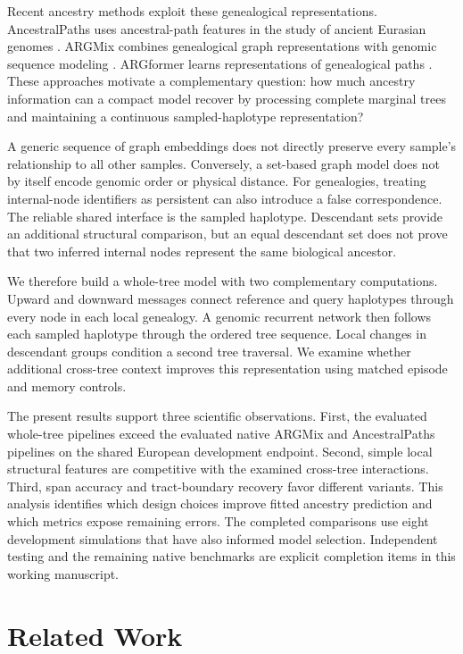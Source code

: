 \documentclass[letterpaper]{article}
\begin{document}
Recent ancestry methods exploit these genealogical representations. AncestralPaths uses ancestral-path features in the study of ancient Eurasian genomes \citep{eurasians2024}. ARGMix combines genealogical graph representations with genomic sequence modeling \citep{ancientancestry2026}. ARGformer learns representations of genealogical paths \citep{argformer2026}. These approaches motivate a complementary question: how much ancestry information can a compact model recover by processing complete marginal trees and maintaining a continuous sampled-haplotype representation?

A generic sequence of graph embeddings does not directly preserve every sample's relationship to all other samples. Conversely, a set-based graph model does not by itself encode genomic order or physical distance. For genealogies, treating internal-node identifiers as persistent can also introduce a false correspondence. The reliable shared interface is the sampled haplotype. Descendant sets provide an additional structural comparison, but an equal descendant set does not prove that two inferred internal nodes represent the same biological ancestor.

We therefore build a whole-tree model with two complementary computations. Upward and downward messages connect reference and query haplotypes through every node in each local genealogy. A genomic recurrent network then follows each sampled haplotype through the ordered tree sequence. Local changes in descendant groups condition a second tree traversal. We examine whether additional cross-tree context improves this representation using matched episode and memory controls.

The present results support three scientific observations. First, the evaluated whole-tree pipelines exceed the evaluated native ARGMix and AncestralPaths pipelines on the shared European development endpoint. Second, simple local structural features are competitive with the examined cross-tree interactions. Third, span accuracy and tract-boundary recovery favor different variants. This analysis identifies which design choices improve fitted ancestry prediction and which metrics expose remaining errors. The completed comparisons use eight development simulations that have also informed model selection. Independent testing and the remaining native benchmarks are explicit completion items in this working manuscript.

\section{Related Work}
\end{document}
